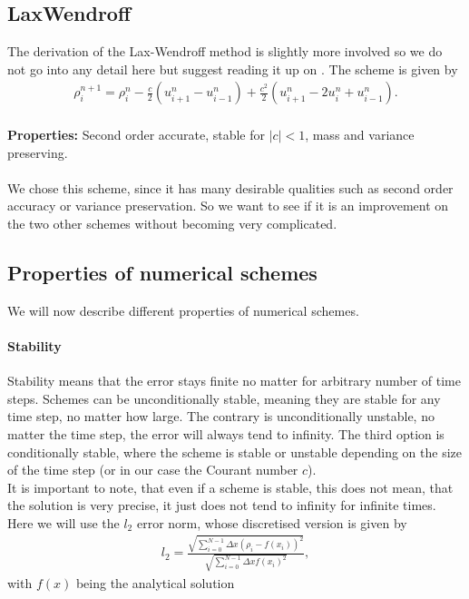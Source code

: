 \subsection{LaxWendroff}
The derivation of the Lax-Wendroff method is slightly more involved so we do not go into any detail here but suggest reading it up on \cite[p.127 f.]{lax_book}. The scheme is given by
\begin{align}
\rho_i^{n+1}=\rho_i^n - \frac c2 \left(u^n_{i+1}-u^n_{i-1}\right) +\frac{c^2}{2}\left(u_{i+1}^n-2u_i^n+u_{i-1}^n\right).
\end{align}
\\
\textbf{Properties:} Second order accurate, stable for $|c|<1$, mass and variance preserving.\cite[p.127]{lax_book} \\ \\
We chose this scheme, since it has many desirable qualities such as second order accuracy or variance preservation. So we want to see if it is an improvement on the two other schemes without becoming very complicated. 
\subsection{Properties of numerical schemes}
We will now describe different properties of numerical schemes.
\paragraph{Stability}
Stability means that the error stays finite no matter for arbitrary number of time steps. Schemes can be unconditionally stable, meaning they are stable for any time step, no matter how large. The contrary is unconditionally unstable, no matter the time step, the error will always tend to infinity. The third option is conditionally stable, where the scheme is stable or unstable depending on the size of the time step (or in our case the Courant number $c$).\\
It is important to note, that even if a scheme is stable, this does not mean, that the solution is very precise, it just does not tend to infinity for infinite times. \\
Here we will use the $l_2$ error norm, whose discretised version is given by
\begin{align}
l_2 =\frac{\sqrt{ \sum_{i=0}^{N-1}\Delta x\left(\rho_i-f(x_i)\right)^2}}{\sqrt{\sum_{i=0}^{N-1}\Delta x f(x_i)^2}},
\end{align}
with $f(x)$ being the analytical solution
